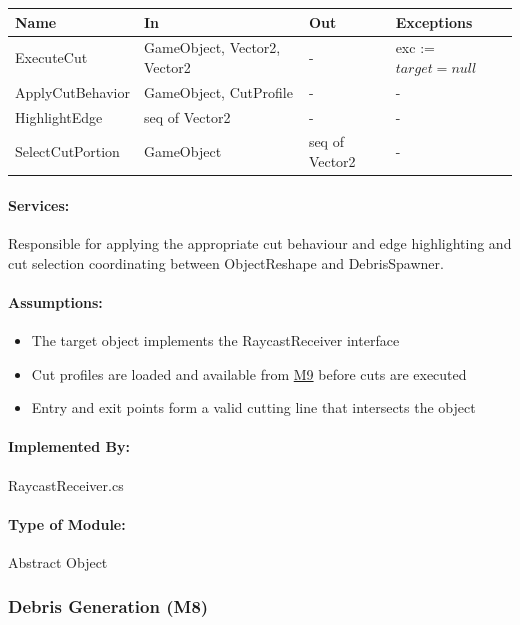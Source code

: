 \documentclass[12pt, titlepage]{article}
\begin{document}
\begin{center}
\begin{tabular}{p{31mm}p{55mm}p{25mm}p{37mm}}
\toprule
\textbf{Name} & \textbf{In} & \textbf{Out} & \textbf{Exceptions} \\
\midrule
ExecuteCut & GameObject, Vector2, Vector2 & - & exc := $target = null$ \\
ApplyCutBehavior & GameObject, CutProfile & - & - \\
HighlightEdge & seq of Vector2 & - & - \\
SelectCutPortion & GameObject & seq of Vector2 & - \\
\bottomrule
\end{tabular}
\end{center}

\paragraph{Services:}
Responsible for applying the appropriate cut behaviour and edge highlighting and cut selection coordinating between ObjectReshape and DebrisSpawner.

\paragraph{Assumptions:}
\begin{itemize}
\item The target object implements the RaycastReceiver interface
\item Cut profiles are loaded and available from \hyperref[M9]{M9} before cuts are executed
\item Entry and exit points form a valid cutting line that intersects the object
\end{itemize}

\paragraph{Implemented By:}
RaycastReceiver.cs

\paragraph{Type of Module:}
Abstract Object

\newpage

\subsubsection{Debris Generation (M8)} \label{M8}
\end{document}
